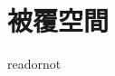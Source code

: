 \documentclass{jsarticle}
\begin{document}
\fi

\section{被覆空間}

\expandafter\ifx\csname readornot\endcsname\relax
  
\end{document}
